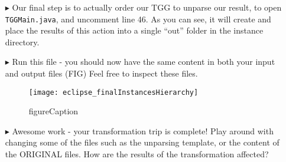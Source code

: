 \begin{itemize}
\item[$\blacktriangleright$] Our final step is to actually order our TGG to unparse our result, to open \texttt{TGGMain.java}, and uncomment line 46. As you can
see, it will create and place the results of this action into a single ``out'' folder in the instance directory. 

\item[$\blacktriangleright$] Run this file - you should now have the same content in both your input and output files (FIG) Feel free to inspect these files.

\vspace{0.5cm}

\begin{figure}[htpb]
\begin{center}
  \texttt{[image: eclipse\_finalInstancesHierarchy]}
  \caption{figureCaption}
  \label{eclipse:dictionaryTemplate}
\end{center}
\end{figure}

\item[$\blacktriangleright$] Awesome work - your transformation trip is complete! Play around with changing some of the files such as the unparsing template, or
the content of the ORIGINAL files. How are the results of the transformation affected?

\end{itemize}